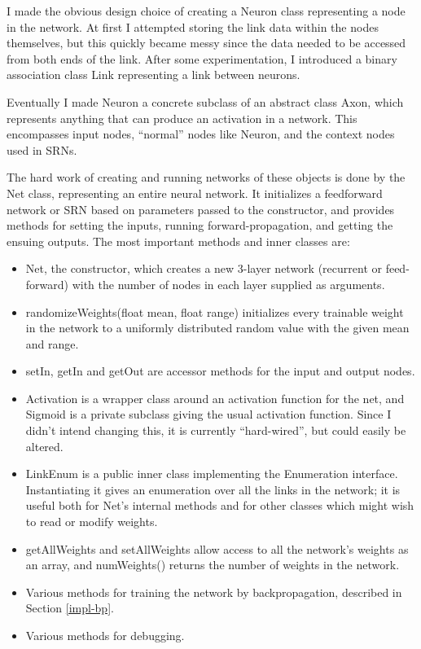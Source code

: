\documentclass[a4paper]{report}
\newcommand{\code}[1]{{\ttfamily #1}}
\begin{document}
I made the obvious design choice of creating a \code{Neuron} class
representing a node in the network. At first I attempted storing the
link data within the nodes themselves, but this quickly became messy
since the data needed to be accessed from both ends of the link.
After some experimentation, I introduced a binary association class
\code{Link} representing a link between neurons.

Eventually I made \code{Neuron} a concrete subclass of an abstract
class \code{Axon}, which represents anything that can produce an
activation in a network. This encompasses input nodes, ``normal''
nodes like Neuron, and the context nodes used in SRNs.

The hard work of creating and running networks of these objects is
done by the \code{Net} class, representing an entire neural network.
It initializes a feedforward network or SRN based on parameters passed
to the constructor, and provides methods for setting the inputs,
running forward-propagation, and getting the ensuing outputs. The
most important methods and inner classes are:

\begin{itemize}

\item \code{Net}, the constructor, which creates a new 3-layer network
  (recurrent or feed-forward) with the number of nodes in each layer
  supplied as arguments.

\item \code{randomizeWeights(float mean, float range)} initializes
  every trainable weight in the network to a uniformly distributed
  random value with the given mean and range.

\item \code{setIn}, \code{getIn} and \code{getOut} are accessor
  methods for the input and output nodes.

\item \code{Activation} is a wrapper class around an activation
  function for the net, and \code{Sigmoid} is a private subclass
  giving the usual activation function. Since I didn't intend changing
  this, it is currently ``hard-wired'', but could easily be altered.

\item \code{LinkEnum} is a public inner class implementing the
  \code{Enumeration} interface. Instantiating it gives an enumeration
  over all the links in the network; it is useful both for
  \code{Net}'s internal methods and for other classes which might wish
  to read or modify weights.

\item \code{getAllWeights} and \code{setAllWeights} allow access to
  all the network's weights as an array, and \code{numWeights()}
  returns the number of weights in the network.

\item Various methods for training the network by backpropagation,
   described in Section \ref{impl-bp}.

\item Various methods for debugging.

\end{itemize}
\end{document}
